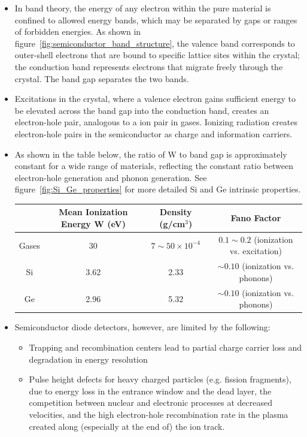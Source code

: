 \begin{itemize}
    \item In band theory, the energy of any electron within the pure material is confined to allowed energy bands, which may be separated by gaps or ranges of forbidden energies. As shown in figure~\ref{fig:semiconductor_band_structure}, the valence band corresponds to outer-shell electrons that are bound to specific lattice sites within the crystal; the conduction band represents electrons that migrate freely through the crystal. The band gap separates the two bands.
    \item Excitations in the crystal, where a valence electron gains sufficient energy to be elevated across the band gap into the conduction band, creates an electron-hole pair, analogous to a ion pair in gases. Ionizing radiation creates electron-hole pairs in the semiconductor as charge and information carriers. 
    \item As shown in the table below, the ratio of W to band gap is approximately constant for a wide range of materials, reflecting the constant ratio between electron-hole generation and phonon generation. See figure~\ref{fig:Si_Ge_properties} for more detailed Si and Ge intrinsic properties.
    \begin{center}
        \begin{tabular}{|c|c|c|c|}
        \hline
         &  Mean Ionization Energy W (eV) & Density (g/cm$^3$) & Fano Factor \\
        \hline
        Gases     & 30 & $7\sim50\times10^{-4}$ & $0.1\sim0.2$ (ionization vs. excitation)\\
        \hline
        Si & 3.62 & 2.33 & $\sim0.10$ (ionization vs. phonons)\\
        \hline
        Ge & 2.96 & 5.32 & $\sim0.10$ (ionization vs. phonons)\\
        \hline
        \end{tabular}
    \end{center}
    \item Semiconductor diode detectors, however, are limited by the following:
    \begin{itemize}
        \item Trapping and recombination centers lead to partial charge carrier loss and degradation in energy resolution
        \item Pulse height defects for heavy charged particles (e.g. fission fragments), due to energy loss in the entrance window and the dead layer, the competition between nuclear and electronic processes at decreased velocities, and the high electron-hole recombination rate in the plasma created along (especially at the end of) the ion track. 
    \end{itemize}
\end{itemize}
